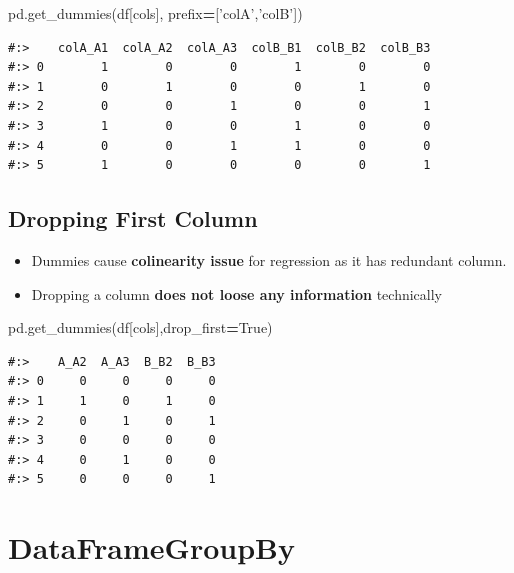 \documentclass[
]{book}
\newenvironment{Shaded}{\begin{snugshade}}{\end{snugshade}}
\newcommand{\NormalTok}[1]{#1}
\newcommand{\OperatorTok}[1]{\textcolor[rgb]{0.43,0.43,0.43}{\textbf{#1}}}
\newcommand{\StringTok}[1]{\textcolor[rgb]{0.5,0.5,0.5}{#1}}
\newcommand{\VariableTok}[1]{\textcolor[rgb]{0,0,0}{#1}}
\providecommand{\tightlist}{%
  \setlength{\itemsep}{0pt}\setlength{\parskip}{0pt}}
\begin{document}
\begin{Shaded}
\begin{Highlighting}[]
\NormalTok{pd.get_dummies(df[cols], prefix}\OperatorTok{=}\NormalTok{[}\StringTok{'colA'}\NormalTok{,}\StringTok{'colB'}\NormalTok{])}
\end{Highlighting}
\end{Shaded}

\begin{verbatim}
#:>    colA_A1  colA_A2  colA_A3  colB_B1  colB_B2  colB_B3
#:> 0        1        0        0        1        0        0
#:> 1        0        1        0        0        1        0
#:> 2        0        0        1        0        0        1
#:> 3        1        0        0        1        0        0
#:> 4        0        0        1        1        0        0
#:> 5        1        0        0        0        0        1
\end{verbatim}

\hypertarget{dropping-first-column}{%
\subsection{Dropping First Column}\label{dropping-first-column}}

\begin{itemize}
\tightlist
\item
  Dummies cause \textbf{colinearity issue} for regression as it has redundant column.\\
\item
  Dropping a column \textbf{does not loose any information} technically
\end{itemize}

\begin{Shaded}
\begin{Highlighting}[]
\NormalTok{pd.get_dummies(df[cols],drop_first}\OperatorTok{=}\VariableTok{True}\NormalTok{)}
\end{Highlighting}
\end{Shaded}

\begin{verbatim}
#:>    A_A2  A_A3  B_B2  B_B3
#:> 0     0     0     0     0
#:> 1     1     0     1     0
#:> 2     0     1     0     1
#:> 3     0     0     0     0
#:> 4     0     1     0     0
#:> 5     0     0     0     1
\end{verbatim}

\hypertarget{dataframegroupby}{%
\section{DataFrameGroupBy}\label{dataframegroupby}}
\end{document}
